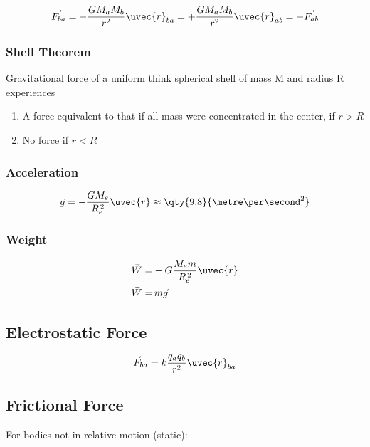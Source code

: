 \documentclass{notes}
\begin{document}
\begin{gather}
    \vec{F_{ba}} = -\frac{GM_aM_b}{r^2} \uvec{r}_{ba} = +\frac{GM_aM_b}{r^2} \uvec{r}_{ab} = - \vec{F_{ab}}
\end{gather}

\subsubsection{Shell Theorem}

Gravitational force of a uniform think spherical shell of mass M and radius R experiences

\begin{enumerate}
    \item A force equivalent to that if all mass were concentrated in the center, if \(r>R\)
    \item No force if \(r<R\)
\end{enumerate}

\subsubsection{Acceleration}

\begin{gather}
    \vec{g} = -\frac{GM_e}{R_e^{\,2}}\uvec{r} \approx \qty{9.8}{\metre\per\second^2}
\end{gather}

\subsubsection{Weight}

\begin{align}
    \vec{W} =& -G\frac{M_em}{R_e^{\,2}}\uvec{r}\\
    \vec{W} =& \, m\vec{g}
\end{align}

\subsection{Electrostatic Force}

\begin{gather}
    \vec{F}_{ba} = k\frac{q_aq_b}{r^2}\uvec{r}_{ba}
\end{gather}

\subsection{Frictional Force}

For bodies not in relative motion (static):
\end{document}
